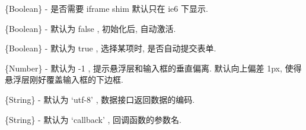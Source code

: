 \documentclass[letterpaper,10pt,english]{sphinxmanual}
\begin{document}
\begin{fulllineitems}
\label{api/component/suggest/index:Suggest.shim}
\{Boolean\} - 是否需要 iframe shim 默认只在 ie6 下显示.

\end{fulllineitems}



\begin{fulllineitems}
\label{api/component/suggest/index:Suggest.autoFocus}
\{Boolean\} - 默认为 false , 初始化后, 自动激活.

\end{fulllineitems}



\begin{fulllineitems}
\label{api/component/suggest/index:Suggest.submitOnSelect}
\{Boolean\} - 默认为 true , 选择某项时, 是否自动提交表单.

\end{fulllineitems}



\begin{fulllineitems}
\label{api/component/suggest/index:Suggest.offset}
\{Number\} - 默认为 -1 , 提示悬浮层和输入框的垂直偏离. 默认向上偏差 1px, 使得悬浮层刚好覆盖输入框的下边框.

\end{fulllineitems}



\begin{fulllineitems}
\label{api/component/suggest/index:Suggest.charset}
\{String\} - 默认为 `utf-8' , 数据接口返回数据的编码.

\end{fulllineitems}



\begin{fulllineitems}
\label{api/component/suggest/index:Suggest.callbackName}
\{String\} - 默认为 `callback' , 回调函数的参数名.

\end{fulllineitems}
\end{document}
